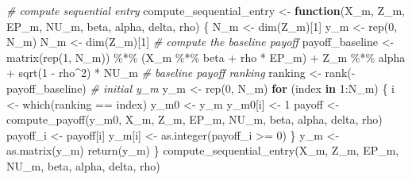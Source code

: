 \documentclass[
]{article}
\newenvironment{Shaded}{\begin{snugshade}}{\end{snugshade}}
\newcommand{\CommentTok}[1]{\textcolor[rgb]{0.56,0.35,0.01}{\textit{#1}}}
\newcommand{\ControlFlowTok}[1]{\textcolor[rgb]{0.13,0.29,0.53}{\textbf{#1}}}
\newcommand{\DecValTok}[1]{\textcolor[rgb]{0.00,0.00,0.81}{#1}}
\newcommand{\FunctionTok}[1]{\textcolor[rgb]{0.00,0.00,0.00}{#1}}
\newcommand{\NormalTok}[1]{#1}
\newcommand{\OtherTok}[1]{\textcolor[rgb]{0.56,0.35,0.01}{#1}}
\newcommand{\SpecialCharTok}[1]{\textcolor[rgb]{0.00,0.00,0.00}{#1}}
\begin{document}
\begin{Shaded}
\begin{Highlighting}[]
\CommentTok{\# compute sequential entry}
\NormalTok{compute\_sequential\_entry }\OtherTok{\textless{}{-}}
  \ControlFlowTok{function}\NormalTok{(X\_m, Z\_m, EP\_m, NU\_m, beta, alpha, delta, rho) \{}
\NormalTok{    N\_m }\OtherTok{\textless{}{-}} \FunctionTok{dim}\NormalTok{(Z\_m)[}\DecValTok{1}\NormalTok{]}
\NormalTok{    y\_m }\OtherTok{\textless{}{-}} \FunctionTok{rep}\NormalTok{(}\DecValTok{0}\NormalTok{, N\_m)}
\NormalTok{    N\_m }\OtherTok{\textless{}{-}} \FunctionTok{dim}\NormalTok{(Z\_m)[}\DecValTok{1}\NormalTok{]}
    \CommentTok{\# compute the baseline payoff}
\NormalTok{    payoff\_baseline }\OtherTok{\textless{}{-}} \FunctionTok{matrix}\NormalTok{(}\FunctionTok{rep}\NormalTok{(}\DecValTok{1}\NormalTok{, N\_m)) }\SpecialCharTok{\%*\%}\NormalTok{ (X\_m }\SpecialCharTok{\%*\%}\NormalTok{ beta }\SpecialCharTok{+}\NormalTok{ rho }\SpecialCharTok{*}\NormalTok{ EP\_m) }\SpecialCharTok{+}\NormalTok{ Z\_m }\SpecialCharTok{\%*\%}\NormalTok{ alpha }\SpecialCharTok{+} \FunctionTok{sqrt}\NormalTok{(}\DecValTok{1} \SpecialCharTok{{-}}\NormalTok{ rho}\SpecialCharTok{\^{}}\DecValTok{2}\NormalTok{) }\SpecialCharTok{*}\NormalTok{ NU\_m }
    \CommentTok{\# baseline payoff ranking}
\NormalTok{    ranking }\OtherTok{\textless{}{-}} \FunctionTok{rank}\NormalTok{(}\SpecialCharTok{{-}}\NormalTok{payoff\_baseline)}
    \CommentTok{\# initial y\_m}
\NormalTok{    y\_m }\OtherTok{\textless{}{-}} \FunctionTok{rep}\NormalTok{(}\DecValTok{0}\NormalTok{, N\_m)}
    \ControlFlowTok{for}\NormalTok{ (index }\ControlFlowTok{in} \DecValTok{1}\SpecialCharTok{:}\NormalTok{N\_m) \{}
\NormalTok{      i }\OtherTok{\textless{}{-}} \FunctionTok{which}\NormalTok{(ranking }\SpecialCharTok{==}\NormalTok{ index)}
\NormalTok{      y\_m0 }\OtherTok{\textless{}{-}}\NormalTok{ y\_m}
\NormalTok{      y\_m0[i] }\OtherTok{\textless{}{-}} \DecValTok{1}
\NormalTok{      payoff }\OtherTok{\textless{}{-}} \FunctionTok{compute\_payoff}\NormalTok{(y\_m0, X\_m, Z\_m, EP\_m, NU\_m, beta, alpha, delta, rho)}
\NormalTok{      payoff\_i }\OtherTok{\textless{}{-}}\NormalTok{ payoff[i]}
\NormalTok{      y\_m[i] }\OtherTok{\textless{}{-}} \FunctionTok{as.integer}\NormalTok{(payoff\_i }\SpecialCharTok{\textgreater{}=} \DecValTok{0}\NormalTok{)}
\NormalTok{    \}}
\NormalTok{    y\_m }\OtherTok{\textless{}{-}} \FunctionTok{as.matrix}\NormalTok{(y\_m)}
    \FunctionTok{return}\NormalTok{(y\_m)}
\NormalTok{  \}}
\FunctionTok{compute\_sequential\_entry}\NormalTok{(X\_m, Z\_m, EP\_m, NU\_m, beta, alpha, delta, rho)}
\end{Highlighting}
\end{Shaded}
\end{document}
